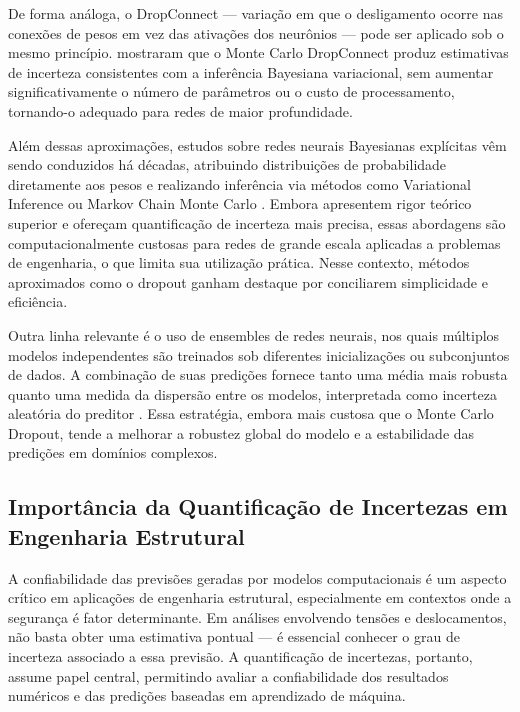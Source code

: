 \documentclass[12pt,openright,oneside,a4paper,english,brazil]{abntex2}
\begin{document}
De forma análoga, o DropConnect — variação em que o desligamento ocorre nas conexões de pesos em vez das ativações dos neurônios — pode ser aplicado sob o mesmo princípio. \textcite{mobiny2019} mostraram que o Monte Carlo DropConnect produz estimativas de incerteza consistentes com a inferência Bayesiana variacional, sem aumentar significativamente o número de parâmetros ou o custo de 
processamento, tornando-o adequado para redes de maior profundidade.

Além dessas aproximações, estudos sobre redes neurais Bayesianas explícitas vêm sendo conduzidos há décadas, atribuindo distribuições de probabilidade diretamente aos pesos e realizando inferência via métodos como Variational Inference ou Markov Chain Monte Carlo \cite{blundell2015}. Embora apresentem rigor teórico superior e ofereçam quantificação de incerteza mais precisa, essas 
abordagens são computacionalmente custosas para redes de grande escala aplicadas a problemas de engenharia, o que limita sua utilização prática. Nesse contexto, métodos aproximados como o dropout ganham destaque por conciliarem simplicidade e eficiência.

Outra linha relevante é o uso de ensembles de redes neurais, nos quais múltiplos modelos independentes são treinados sob diferentes inicializações ou subconjuntos de dados. A combinação de suas predições fornece tanto uma média mais robusta quanto uma medida da dispersão entre os modelos, interpretada como incerteza aleatória do preditor \cite{lakshminarayanan2017}. Essa estratégia, 
embora mais custosa que o Monte Carlo Dropout, tende a melhorar a robustez global do modelo e a estabilidade das predições em domínios complexos.

\subsection{Importância da Quantificação de Incertezas em Engenharia Estrutural}

A confiabilidade das previsões geradas por modelos computacionais é um aspecto crítico em aplicações de engenharia estrutural, especialmente em contextos onde a segurança é fator determinante. Em análises envolvendo tensões e deslocamentos, não basta obter uma estimativa pontual — é essencial conhecer o grau de incerteza associado a essa previsão. A quantificação de incertezas, portanto, 
assume papel central, permitindo avaliar a confiabilidade dos resultados numéricos e das predições baseadas em aprendizado de máquina.
\end{document}
